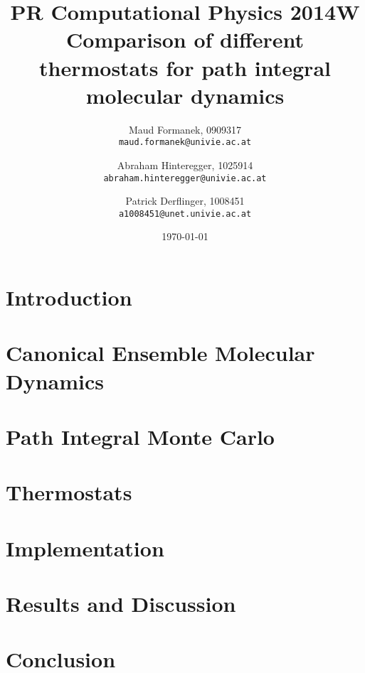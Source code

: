 \documentclass[a4paper]{article}
\title{PR Computational Physics 2014W \\ Comparison of different thermostats for path integral molecular dynamics }
\author{
	Maud Formanek, 0909317\\
    \texttt{maud.formanek@univie.ac.at}
	\and
    Abraham Hinteregger,  1025914\\
    \texttt{abraham.hinteregger@univie.ac.at}\and
    Patrick Derflinger,  1008451\\
    \texttt{a1008451@unet.univie.ac.at}
    }
\date{\today}
\begin{document}
\maketitle
\tableofcontents

\newpage

\section{Introduction} \label{intro}

\section{Canonical Ensemble Molecular Dynamics} \label{cemd}

\section{Path Integral Monte Carlo} \label{pimd}

\section{Thermostats} \label{thermostats}

\section{Implementation}\label{implementation}

\section{Results and Discussion} \label{results}

\section{Conclusion}

\newpage
%
%


\end{document}
